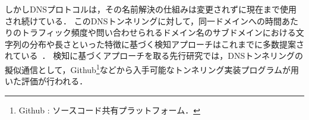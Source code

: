 しかしDNSプロトコルは，その名前解決の仕組みは変更されずに現在まで使用され続けている．
このDNSトンネリングに対して，同一ドメインへの時間あたりのトラフィック頻度や問い合わせられるドメイン名のサブドメインにおける文字列の分布や長さといった特徴に基づく検知アプローチはこれまでに多数提案されている~\cite{born, cheng, liu, asaf, steadman, jawad}．
検知に基づくアプローチを取る先行研究では，DNSトンネリングの擬似通信として，Github\footnote{Github : ソースコード共有プラットフォーム．}などから入手可能なトンネリング実装プログラムが用いた評価が行われる．
